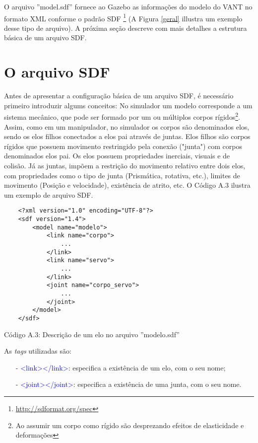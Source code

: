O arquivo ''model.sdf'' fornece ao Gazebo as informações do modelo do VANT no formato XML conforme o padrão SDF \footnote{\url{http://sdformat.org/spec}} (A Figura \ref{geral} illustra um exemplo desse tipo de arquivo). A próxima seção descreve com mais detalhes a estrutura básica de um arquivo SDF.

\section{O arquivo SDF}

Antes de apresentar a configuração básica de um arquivo SDF, é necessário primeiro introduzir algums conceitos: No simulador um modelo corresponde a um sistema mecânico, que pode ser formado por um ou múltiplos corpos rígidos\footnote{Ao assumir um corpo como rígido são desprezando efeitos de elasticidade e deformações}. Assim, como em um manipulador, no simulador os corpos são denominados elos, sendo os elos filhos conectados a elos pai através de juntas. Elos filhos são corpos rígidos que possuem movimento restringido pela conexão ("junta") com corpos denominados elos pai. Os elos possuem propriedades inerciais, visuais e de colisão. Já as juntas, impõem a restrição do movimento relativo entre dois elos, com propriedades como o tipo de junta (Prismática, rotativa, etc.), limites de movimento (Posição e velocidade), existência de atrito, etc. O Código A.3 ilustra um exemplo de arquivo SDF.
 
	\begin{verbatim}
	<?xml version="1.0" encoding="UTF-8"?>
	<sdf version="1.4">
		<model name="modelo">
			<link name="corpo">
				...
			</link>
			<link name="servo">
				...
			</link>
			<joint name="corpo_servo">
				...
			</joint>
		</model>
	</sdf>
	\end{verbatim}
	
	\centerline{Código A.3: Descrição de um elo no arquivo ''modelo.sdf''}
	
	\vspace{1cm}
	 
	 As \textit{tags} utilizadas são:
	 \small
	 \begin{itemize}
	 \setlength{\itemsep}{1pt}
	 \setlength{\parskip}{0pt}
	 \setlength{\parsep}{0pt}
	 \item[-] \textcolor{blue}{<link></link>}: especifica a existência de um elo, com o seu nome;
	 \item[-] \textcolor{blue}{<joint></joint>}: especifica a existência de uma junta, com o seu nome.  
	 \end{itemize}\normalsize
	 

